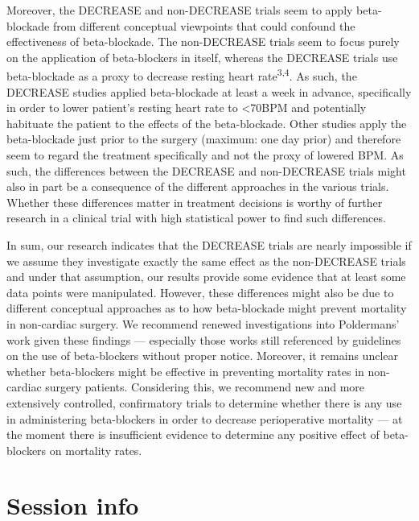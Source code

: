 \documentclass[]{article}
\begin{document}
Moreover, the DECREASE and non-DECREASE trials seem to apply
beta-blockade from different conceptual viewpoints that could confound
the effectiveness of beta-blockade. The non-DECREASE trials seem to
focus purely on the application of beta-blockers in itself, whereas the
DECREASE trials use beta-blockade as a proxy to decrease resting heart
rate\textsuperscript{3,4}. As such, the DECREASE studies applied
beta-blockade at least a week in advance, specifically in order to lower
patient's resting heart rate to \textless{}70BPM and potentially
habituate the patient to the effects of the beta-blockade. Other studies
apply the beta-blockade just prior to the surgery (maximum: one day
prior) and therefore seem to regard the treatment specifically and not
the proxy of lowered BPM. As such, the differences between the DECREASE
and non-DECREASE trials might also in part be a consequence of the
different approaches in the various trials. Whether these differences
matter in treatment decisions is worthy of further research in a
clinical trial with high statistical power to find such differences.

In sum, our research indicates that the DECREASE trials are nearly
impossible if we assume they investigate exactly the same effect as the
non-DECREASE trials and under that assumption, our results provide some
evidence that at least some data points were manipulated. However, these
differences might also be due to different conceptual approaches as to
how beta-blockade might prevent mortality in non-cardiac surgery. We
recommend renewed investigations into Poldermans' work given these
findings --- especially those works still referenced by guidelines on
the use of beta-blockers without proper notice. Moreover, it remains
unclear whether beta-blockers might be effective in preventing mortality
rates in non-cardiac surgery patients. Considering this, we recommend
new and more extensively controlled, confirmatory trials to determine
whether there is any use in administering beta-blockers in order to
decrease perioperative mortality --- at the moment there is insufficient
evidence to determine any positive effect of beta-blockers on mortality
rates.

\section{Session info}\label{session-info}
\end{document}
